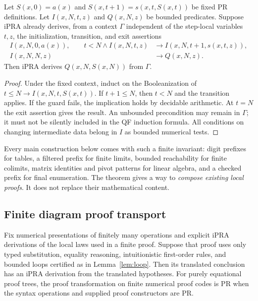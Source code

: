\begin{lemma}
\label{lem:loop}
Let $S(x,0)=a(x)$ and $S(x,t+1)=s(x,t,S(x,t))$ be fixed PR definitions.
Let $I(x,N,t,z)$ and $Q(x,N,z)$ be bounded predicates. Suppose iPRA already
derives, from a context $\Gamma$ independent of the step-local variables
$t,z$, the initialization,
transition, and exit assertions
\begin{align*}
 I(x,N,0,a(x)),\qquad
 t<N\wedge I(x,N,t,z)&\to I(x,N,t+1,s(x,t,z)),\\
 I(x,N,N,z)&\to Q(x,N,z).
\end{align*}
Then iPRA derives $Q(x,N,S(x,N))$ from $\Gamma$.
\end{lemma}

\begin{proof}
Under the fixed context, induct on the Booleanization of
$t\le N\to I(x,N,t,S(x,t))$. If $t+1\le N$, then $t<N$ and the transition
applies. If the guard fails, the implication holds by decidable arithmetic.
At $t=N$ the exit assertion gives the result. An unbounded precondition may
remain in $\Gamma$; it must not be silently included in the QF induction
formula. All conditions on changing intermediate data belong in $I$ as
bounded numerical tests.
\end{proof}

Every main construction below comes with such a finite invariant: digit
prefixes for tables, a filtered prefix for finite limits, bounded reachability
for finite colimits, matrix identities and pivot patterns for linear algebra,
and a checked prefix for final enumeration. The theorem gives a way to
\emph{compose existing local proofs}. It does not replace their mathematical
content.

\subsection{Finite diagram proof transport}

\begin{theorem}
\label{thm:transport}
Fix numerical presentations of finitely many operations and explicit iPRA
derivations of the local laws used in a finite proof. Suppose that proof uses
only typed substitution, equality reasoning, intuitionistic first-order rules,
and bounded loops certified as in Lemma~\ref{lem:loop}. Then its translated
conclusion has an iPRA derivation from the translated hypotheses. For purely
equational proof trees, the proof transformation on finite numerical proof
codes is PR when the syntax operations and supplied proof constructors are PR.
\end{theorem}

